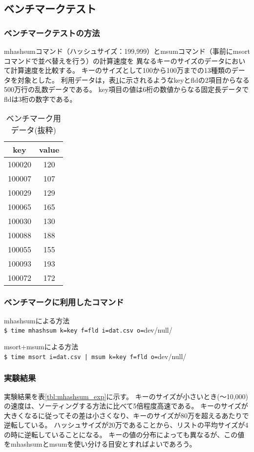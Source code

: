 \subsection*{ベンチマークテスト}
\subsubsection*{ベンチマークテストの方法}
mhashsumコマンド（ハッシュサイズ：199,999）とmsumコマンド（事前にmsortコマンドで並べ替えを行う）の計算速度を
異なるキーのサイズのデータにおいて計算速度を比較する。
キーのサイズとして100から100万までの13種類のデータを対象とした。
利用データは，表\ref{tbl:mhashsum_dat}に示されるようなkeyとfldの2項目からなる500万行の乱数データである。
key項目の値は6桁の数値からなる固定長データでfldは3桁の数字である。

\begin{table}[hbt]
\begin{center}
\caption{ベンチマーク用データ(抜粋)\label{tbl:mhashsum_dat}}
\begin{tabular}{c|c}
\hline
key & value \\ \hline
100020&120 \\
100007&107 \\
100029&129 \\
100065&165 \\
100030&130 \\
100088&188 \\
100055&155 \\
100093&193 \\
100072&172 \\
\hline
\end{tabular}
\end{center}
\end{table}

\subsubsection*{ベンチマークに利用したコマンド}
mhashsumによる方法\\
\verb/$ time mhashsum k=key f=fld i=dat.csv o=/dev/null/

msort+msumによる方法\\
\verb/$ time msort i=dat.csv | msum k=key f=fld o=/dev/null/

\subsubsection*{実験結果}

実験結果を表\ref{tbl:mhashsum_exp}に示す。
キーのサイズが小さいとき(～10,000)の速度は、ソーティングする方法に比べて5倍程度高速である。
キーのサイズが大きくなるに従ってその差は小さくなり、キーのサイズが80万を超えるあたりで逆転している。
ハッシュサイズが20万であることから、リストの平均サイズが4の時に逆転していることになる。
キーの値の分布によっても異なるが、この値をmhashsumとmsumを使い分ける目安とすればよいであろう。

